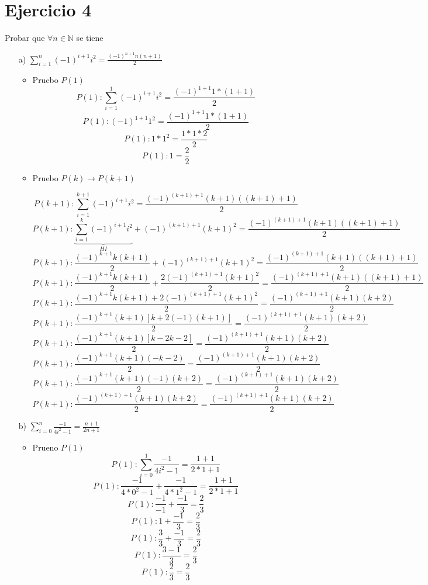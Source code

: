 \documentclass[10pt,a4paper]{article}
\begin{document}
\section*{Ejercicio 4}
Probar que $\forall n \in \mathbb{N}$ se tiene
\begin{enumerate}
\item[a)]$\sum^{n}_{i=1}(-1)^{i+1}i^{2}=\frac{(-1)^{n+1}n(n+1)}{2}$

	\begin{itemize}
	\item Pruebo $P(1)$
	$$P(1):\sum^{1}_{i=1}(-1)^{i+1}i^{2}=\frac{(-1)^{1+1}1*(1+1)}{2}$$
	$$P(1):(-1)^{1+1}1^{2}=\frac{(-1)^{1+1}1*(1+1)}{2}$$
	$$P(1):1*1^{2}=\frac{1*1*2}{2}$$
	$$P(1):1=\frac{2}{2}$$
	
	\item Pruebo $P(k)\rightarrow P(k+1)$
	
	$$P(k+1):\sum^{k+1}_{i=1}(-1)^{i+1}i^{2}=\frac{(-1)^{(k+1)+1}(k+1)((k+1)+1)}{2}$$
	$$P(k+1):\underbrace{\sum^{k}_{i=1}(-1)^{i+1}i^{2}}_{HI}+ (-1)^{(k+1)+1}(k+1)^{2}   =\frac{(-1)^{(k+1)+1}(k+1)((k+1)+1)}{2}$$
	$$P(k+1):  \frac{(-1)^{k+1}k(k+1)}{2}   + (-1)^{(k+1)+1}(k+1)^{2}   =\frac{(-1)^{(k+1)+1}(k+1)((k+1)+1)}{2}$$
	$$P(k+1):  \frac{(-1)^{k+1}k(k+1)}{2}   +  \frac{2(-1)^{(k+1)+1}(k+1)^{2}}{2}   =\frac{(-1)^{(k+1)+1}(k+1)((k+1)+1)}{2}$$
	$$P(k+1):  \frac{(-1)^{k+1}k(k+1)+2(-1)^{(k+1)+1}(k+1)^{2}}{2}   =\frac{(-1)^{(k+1)+1}(k+1)(k+2)}{2}$$
	$$P(k+1):  \frac{(-1)^{k+1}(k+1)[k+2(-1)(k+1)]}{2}   =\frac{(-1)^{(k+1)+1}(k+1)(k+2)}{2}$$
	$$P(k+1):  \frac{(-1)^{k+1}(k+1)[k-2k-2]}{2}   =\frac{(-1)^{(k+1)+1}(k+1)(k+2)}{2}$$
	$$P(k+1):  \frac{(-1)^{k+1}(k+1)(-k-2)}{2}   =\frac{(-1)^{(k+1)+1}(k+1)(k+2)}{2}$$
	$$P(k+1):  \frac{(-1)^{k+1}(k+1)(-1)(k+2)}{2}   =\frac{(-1)^{(k+1)+1}(k+1)(k+2)}{2}$$
	$$P(k+1):  \frac{(-1)^{(k+1)+1}(k+1)(k+2)}{2}   =\frac{(-1)^{(k+1)+1}(k+1)(k+2)}{2}$$
	
	\end{itemize}
	
\item[b)]$\sum^{n}_{i=0}\frac{-1}{4i^{2}-1}=\frac{n+1}{2n+1}$
	\begin{itemize}
	\item Prueno $P(1)$
	$$P(1):\sum^{1}_{i=0}\frac{-1}{4i^{2}-1}=\frac{1+1}{2*1+1}$$
	$$P(1): \frac{-1}{4*0^{2}-1} + \frac{-1}{4*1^{2}-1}  =\frac{1+1}{2*1+1}$$
	$$P(1): \frac{-1}{-1} + \frac{-1}{3}  =\frac{2}{3}$$
	$$P(1): 1 + \frac{-1}{3}  =\frac{2}{3}$$
	$$P(1): \frac{3}{3} + \frac{-1}{3}  =\frac{2}{3}$$
	$$P(1): \frac{3-1}{3}  =\frac{2}{3}$$
	$$P(1): \frac{2}{3}  =\frac{2}{3}$$
	

\end{itemize}
\end{enumerate}
\end{document}
